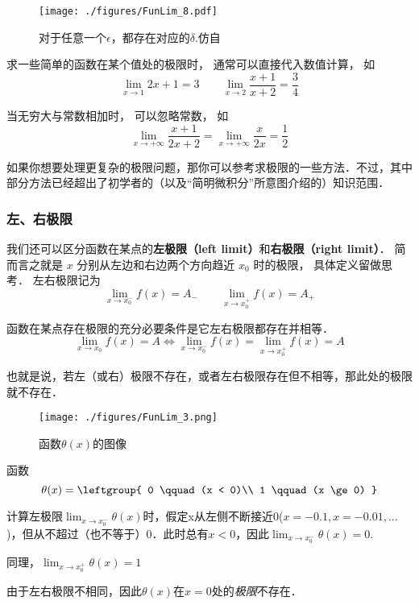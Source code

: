 \begin{figure}[ht]
\centering
\texttt{[image: ./figures/FunLim\_8.pdf]}
\caption{对于任意一个$\epsilon$，都存在对应的$\delta$.仿自\cite{Thomas}} \label{FunLim_fig8}
\end{figure}

\begin{example}{}
求一些简单的函数在某个值处的极限时， 通常可以直接代入数值计算， 如
\begin{equation}
\lim_{x\to 1} 2x + 1 = 3 \qquad \lim_{x\to 2}\frac{x + 1}{x + 2} = \frac34
\end{equation}

当无穷大与常数相加时， 可以忽略常数， 如
\begin{equation}
\lim_{x\to +\infty} \frac{x + 1}{2x + 2} = \lim_{x\to +\infty} \frac{x}{2x} = \frac12
\end{equation}

如果你想要处理更复杂的极限问题，那你可以参考求极限的一些方法．不过，其中部分方法已经超出了初学者的（以及“简明微积分”所意图介绍的）知识范围．
\end{example}

\subsubsection{左、右极限}
我们还可以区分函数在某点的\textbf{左极限（left limit）}和\textbf{右极限（right limit）}． 简而言之就是 $x$ 分别从左边和右边两个方向趋近 $x_0$ 时的极限， 具体定义留做思考． 左右极限记为
\begin{equation}
\lim_{x\to x_0^-} f(x) = A_- \qquad \lim_{x\to x_0^+} f(x) = A_+
\end{equation}

\begin{theorem}{}
函数在某点存在极限的充分必要条件是它左右极限都存在并相等．
$$\lim_{x\to x_0} f(x) = A \Leftrightarrow \lim_{x\to x_0^-} f(x) = \lim_{x\to x_0^+} f(x) = A $$

也就是说，若左（或右）极限不存在，或者左右极限存在但不相等，那此处的极限就不存在．
\end{theorem}

\begin{example}{}
\begin{figure}[ht]
\centering
\texttt{[image: ./figures/FunLim\_3.png]}
\caption{函数$\theta(x)$的图像} \label{FunLim_fig3}
\end{figure}
函数
\begin{equation}
\theta(x) = \leftgroup{
0 \qquad (x < 0)\\
1 \qquad (x \ge 0)
}\end{equation}

计算左极限$\lim_{x\to x_0^-} \theta(x)$时，假定x从左侧不断接近$0$($x=-0.1,x=-0.01,...$)，但从不超过（也不等于）$0$．此时总有$x<0$，因此$\lim_{x\to x_0^-} \theta(x) = 0$. 

同理，$\lim_{x\to x_0^+} \theta(x) = 1$

由于左右极限不相同，因此$\theta(x)$在$x=0$处的\textsl{极限}不存在．
\end{example}

